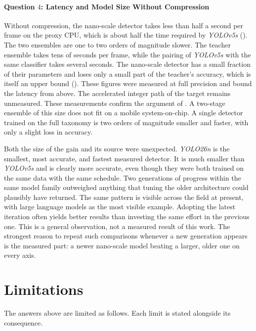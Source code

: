 \paragraph{Question $4$: Latency and Model Size Without Compression}
Without compression, the nano-scale detector takes less than half a second per frame on the proxy CPU, which is about half the time required by \textit{YOLOv5s} (). The two ensembles are one to two orders of magnitude slower. The teacher ensemble takes tens of seconds per frame, while the pairing of \textit{YOLOv5s} with the same classifier takes several seconds. The nano-scale detector has a small fraction of their parameters and loses only a small part of the teacher's accuracy, which is itself an upper bound (). These figures were measured at full precision and bound the latency from above. The accelerated integer path of the target remains unmeasured. These measurements confirm the argument of . A two-stage ensemble of this size does not fit on a mobile system-on-chip. A single detector trained on the full taxonomy is two orders of magnitude smaller and faster, with only a slight loss in accuracy.

Both the size of the gain and its source were unexpected. \textit{YOLO26n} is the smallest, most accurate, and fastest measured detector. It is much smaller than \textit{YOLOv5s} and is clearly more accurate, even though they were both trained on the same data with the same schedule. Two generations of progress within the same model family outweighed anything that tuning the older architecture could plausibly have returned. The same pattern is visible across the field at present, with large language models as the most visible example. Adopting the latest iteration often yields better results than investing the same effort in the previous one. This is a general observation, not a measured result of this work. The strongest reason to repeat such comparisons whenever a new generation appears is the measured part: a newer nano-scale model beating a larger, older one on every axis.

\section{Limitations}\label{sec:limitations}

The answers above are limited as follows. Each limit is stated alongside its consequence.

